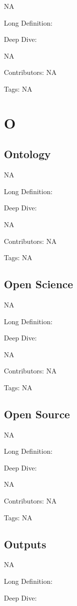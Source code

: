 \documentclass[
  letterpaper,
  DIV=11,
  numbers=noendperiod]{scrreprt}
\begin{document}
NA

Long Definition:

Deep Dive:

NA

Contributors: NA

Tags: NA


\chapter{O}\label{o}

\section{Ontology}\label{ontology}

NA

Long Definition:

Deep Dive:

NA

Contributors: NA

Tags: NA

\section{Open Science}\label{open-science}

NA

Long Definition:

Deep Dive:

NA

Contributors: NA

Tags: NA

\section{Open Source}\label{open-source}

NA

Long Definition:

Deep Dive:

NA

Contributors: NA

Tags: NA

\section{Outputs}\label{outputs}

NA

Long Definition:

Deep Dive:
\end{document}

